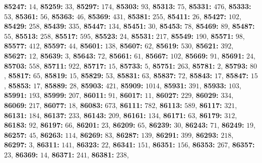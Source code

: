\textsf{\bfseries 85247:} $14$, \textsf{\bfseries 85259:} $33$, \textsf{\bfseries 85297:} $174$, \textsf{\bfseries 85303:} $93$, \textsf{\bfseries 85313:} $75$, \textsf{\bfseries 85331:} $476$, \textsf{\bfseries 85333:} $53$, \textsf{\bfseries 85361:} $56$, \textsf{\bfseries 85363:} $46$, \textsf{\bfseries 85369:} $431$, \textsf{\bfseries 85381:} $255$, \textsf{\bfseries 85411:} $26$, \textsf{\bfseries 85427:} $102$, \textsf{\bfseries 85429:} $258$, \textsf{\bfseries 85439:} $335$, \textsf{\bfseries 85447:} $134$, \textsf{\bfseries 85451:} $30$, \textsf{\bfseries 85453:} $78$, \textsf{\bfseries 85469:} $89$, \textsf{\bfseries 85487:} $55$, \textsf{\bfseries 85513:} $258$, \textsf{\bfseries 85517:} $595$, \textsf{\bfseries 85523:} $24$, \textsf{\bfseries 85531:} $217$, \textsf{\bfseries 85549:} $190$, \textsf{\bfseries 85571:} $98$, \textsf{\bfseries 85577:} $412$, \textsf{\bfseries 85597:} $44$, \textsf{\bfseries 85601:} $138$, \textsf{\bfseries 85607:} $62$, \textsf{\bfseries 85619:} $530$, \textsf{\bfseries 85621:} $392$, \textsf{\bfseries 85627:} $12$, \textsf{\bfseries 85639:} $3$, \textsf{\bfseries 85643:} $72$, \textsf{\bfseries 85661:} $61$, \textsf{\bfseries 85667:} $102$, \textsf{\bfseries 85669:} $91$, \textsf{\bfseries 85691:} $24$, \textsf{\bfseries 85703:} $558$, \textsf{\bfseries 85711:} $922$, \textsf{\bfseries 85717:} $15$, \textsf{\bfseries 85733:} $5$, \textsf{\bfseries 85751:} $263$, \textsf{\bfseries 85781:} $2$, \textsf{\bfseries 85793:} $80$, \textsf{\bfseries 85817:} $65$, \textsf{\bfseries 85819:} $15$, \textsf{\bfseries 85829:} $53$, \textsf{\bfseries 85831:} $63$, \textsf{\bfseries 85837:} $72$, \textsf{\bfseries 85843:} $17$, \textsf{\bfseries 85847:} $15$, \textsf{\bfseries 85853:} $17$, \textsf{\bfseries 85889:} $28$, \textsf{\bfseries 85903:} $421$, \textsf{\bfseries 85909:} $1014$, \textsf{\bfseries 85931:} $391$, \textsf{\bfseries 85933:} $103$, \textsf{\bfseries 85991:} $193$, \textsf{\bfseries 85999:} $207$, \textsf{\bfseries 86011:} $91$, \textsf{\bfseries 86017:} $11$, \textsf{\bfseries 86027:} $229$, \textsf{\bfseries 86029:} $334$, \textsf{\bfseries 86069:} $217$, \textsf{\bfseries 86077:} $18$, \textsf{\bfseries 86083:} $673$, \textsf{\bfseries 86111:} $782$, \textsf{\bfseries 86113:} $589$, \textsf{\bfseries 86117:} $321$, \textsf{\bfseries 86131:} $184$, \textsf{\bfseries 86137:} $233$, \textsf{\bfseries 86143:} $209$, \textsf{\bfseries 86161:} $134$, \textsf{\bfseries 86171:} $63$, \textsf{\bfseries 86179:} $312$, \textsf{\bfseries 86183:} $92$, \textsf{\bfseries 86197:} $66$, \textsf{\bfseries 86201:} $23$, \textsf{\bfseries 86209:} $65$, \textsf{\bfseries 86239:} $30$, \textsf{\bfseries 86243:} $71$, \textsf{\bfseries 86249:} $19$, \textsf{\bfseries 86257:} $45$, \textsf{\bfseries 86263:} $114$, \textsf{\bfseries 86269:} $83$, \textsf{\bfseries 86287:} $139$, \textsf{\bfseries 86291:} $399$, \textsf{\bfseries 86293:} $218$, \textsf{\bfseries 86297:} $3$, \textsf{\bfseries 86311:} $141$, \textsf{\bfseries 86323:} $22$, \textsf{\bfseries 86341:} $151$, \textsf{\bfseries 86351:} $156$, \textsf{\bfseries 86353:} $267$, \textsf{\bfseries 86357:} $23$, \textsf{\bfseries 86369:} $14$, \textsf{\bfseries 86371:} $241$, \textsf{\bfseries 86381:} $238$, 
